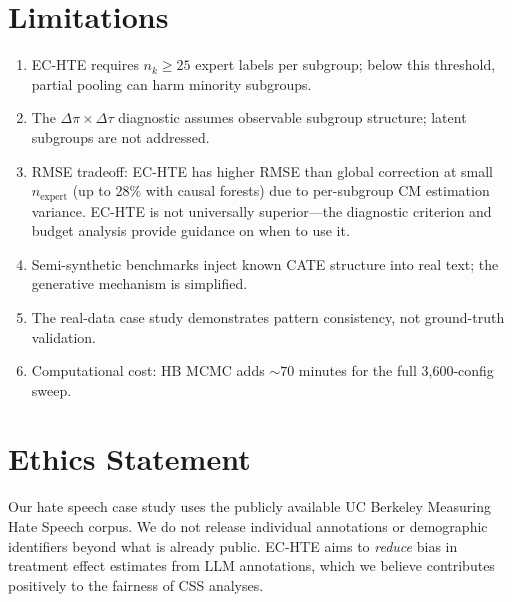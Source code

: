 \documentclass[11pt,twocolumn]{article}
\theoremstyle{remark}
\begin{document}
\section*{Limitations}

\begin{enumerate}
\item EC-HTE requires $n_k \geq 25$ expert labels per subgroup; below this threshold, partial pooling can harm minority subgroups.
\item The $\Delta\pi \times \Delta\tau$ diagnostic assumes observable subgroup structure; latent subgroups are not addressed.
\item RMSE tradeoff: EC-HTE has higher RMSE than global correction at small $n_{\mathrm{expert}}$ (up to $28\%$ with causal forests) due to per-subgroup CM estimation variance. EC-HTE is not universally superior---the diagnostic criterion and budget analysis provide guidance on when to use it.
\item Semi-synthetic benchmarks inject known CATE structure into real text; the generative mechanism is simplified.
\item The real-data case study demonstrates pattern consistency, not ground-truth validation.
\item Computational cost: HB MCMC adds ${\sim}70$ minutes for the full 3{,}600-config sweep.
\end{enumerate}

\section*{Ethics Statement}

Our hate speech case study uses the publicly available UC Berkeley Measuring Hate Speech corpus.
We do not release individual annotations or demographic identifiers beyond what is already public.
EC-HTE aims to \emph{reduce} bias in treatment effect estimates from LLM annotations, which we believe contributes positively to the fairness of CSS analyses.
\end{document}
